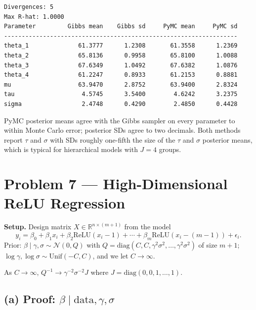 \documentclass[
  letterpaper,
  DIV=11,
  numbers=noendperiod]{scrartcl}
\begin{document}
\begin{verbatim}
Divergences: 5
Max R-hat: 1.0000
Parameter         Gibbs mean    Gibbs sd     PyMC mean     PyMC sd
------------------------------------------------------------------
theta_1              61.3777      1.2308       61.3558      1.2369
theta_2              65.8136      0.9958       65.8100      1.0088
theta_3              67.6349      1.0492       67.6382      1.0876
theta_4              61.2247      0.8933       61.2153      0.8881
mu                   63.9470      2.8752       63.9400      2.8324
tau                   4.5745      3.5400        4.6242      3.2375
sigma                 2.4748      0.4290        2.4850      0.4428
\end{verbatim}

PyMC posterior means agree with the Gibbs sampler on every parameter to
within Monte Carlo error; posterior SDs agree to two decimals. Both
methods report \(\tau\) and \(\sigma\) with SDs roughly one-fifth the
size of the \(\tau\) and \(\sigma\) posterior means, which is typical
for hierarchical models with \(J=4\) groups.

\newpage

\section{Problem 7 --- High-Dimensional ReLU
Regression}\label{problem-7-high-dimensional-relu-regression}

\textbf{Setup.} Design matrix \(X \in \mathbb{R}^{n \times (m+1)}\) from
the model \[
y_i = \beta_0 + \beta_1 x_i + \beta_2 \text{ReLU}(x_i - 1) + \cdots + \beta_m \text{ReLU}(x_i - (m-1)) + \epsilon_i.
\] Prior: \(\beta \mid \gamma, \sigma \sim \mathcal{N}(0, Q)\) with
\(Q = \text{diag}(C, C, \gamma^2\sigma^2, \dots, \gamma^2\sigma^2)\) of
size \(m+1\); \(\log\gamma, \log\sigma \sim \text{Unif}(-C, C)\), and we
let \(C \to \infty\).

As \(C \to \infty\), \(Q^{-1} \to \gamma^{-2}\sigma^{-2} J\) where
\(J = \text{diag}(0, 0, 1, \dots, 1)\).

\subsection{\texorpdfstring{(a) Proof:
\(\beta \mid \text{data}, \gamma, \sigma\)}{(a) Proof: \textbackslash beta \textbackslash mid \textbackslash text\{data\}, \textbackslash gamma, \textbackslash sigma}}\label{a-proof-beta-mid-textdata-gamma-sigma}
\end{document}
